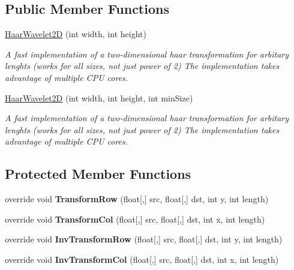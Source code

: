 \subsection*{\-Public \-Member \-Functions}
\begin{DoxyCompactItemize}
\item 
\hyperlink{class_turbo_wavelets_1_1_haar_wavelet2_d_ab55a20658fe1f22b6e756418b4e1dc29}{\-Haar\-Wavelet2\-D} (int width, int height)
\begin{DoxyCompactList}\small\item\em \-A fast implementation of a two-\/dimensional haar transformation for arbitary lenghts (works for all sizes, not just power of 2) \-The implementation takes advantage of multiple \-C\-P\-U cores. \end{DoxyCompactList}\item 
\hyperlink{class_turbo_wavelets_1_1_haar_wavelet2_d_a8064166eec2c0a4b66378896b882bd47}{\-Haar\-Wavelet2\-D} (int width, int height, int min\-Size)
\begin{DoxyCompactList}\small\item\em \-A fast implementation of a two-\/dimensional haar transformation for arbitary lenghts (works for all sizes, not just power of 2) \-The implementation takes advantage of multiple \-C\-P\-U cores. \end{DoxyCompactList}\end{DoxyCompactItemize}
\subsection*{\-Protected \-Member \-Functions}
\begin{DoxyCompactItemize}
\item 
\hypertarget{class_turbo_wavelets_1_1_haar_wavelet2_d_a55f6abb99bf5d87017e715b63f64cc15}{override void {\bfseries \-Transform\-Row} (float\mbox{[},\mbox{]} src, float\mbox{[},\mbox{]} dst, int y, int length)}\label{class_turbo_wavelets_1_1_haar_wavelet2_d_a55f6abb99bf5d87017e715b63f64cc15}

\item 
\hypertarget{class_turbo_wavelets_1_1_haar_wavelet2_d_a5695f7a35bbbae2f64d5c92212cd1f83}{override void {\bfseries \-Transform\-Col} (float\mbox{[},\mbox{]} src, float\mbox{[},\mbox{]} dst, int x, int length)}\label{class_turbo_wavelets_1_1_haar_wavelet2_d_a5695f7a35bbbae2f64d5c92212cd1f83}

\item 
\hypertarget{class_turbo_wavelets_1_1_haar_wavelet2_d_a870ff202a886a34c54013b867e56f6e6}{override void {\bfseries \-Inv\-Transform\-Row} (float\mbox{[},\mbox{]} src, float\mbox{[},\mbox{]} dst, int y, int length)}\label{class_turbo_wavelets_1_1_haar_wavelet2_d_a870ff202a886a34c54013b867e56f6e6}

\item 
\hypertarget{class_turbo_wavelets_1_1_haar_wavelet2_d_a780d0ea14dea6a587c8ebf21f19670d0}{override void {\bfseries \-Inv\-Transform\-Col} (float\mbox{[},\mbox{]} src, float\mbox{[},\mbox{]} dst, int x, int length)}\label{class_turbo_wavelets_1_1_haar_wavelet2_d_a780d0ea14dea6a587c8ebf21f19670d0}

\end{DoxyCompactItemize}
